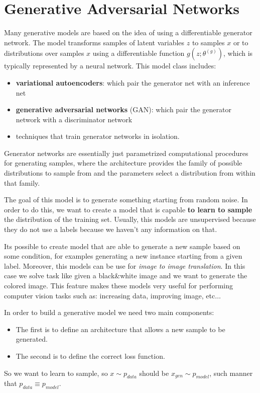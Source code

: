 \chapter{Generative Adversarial Networks}
Many generative models are based on the idea of using a differentiable generator network. The model 
transforms samples of latent variables $z$ to samples $x$ or to distributions over samples $x$ using a 
differentiable function $g(z; \theta^{(g)})$, which is typically represented by a neural network. This 
model class includes:
\begin{itemize}
    \item \textbf{variational autoencoders}: which pair the generator net with an inference 
    net
    \item \textbf{generative adversarial networks} (GAN): which pair the generator network with a discriminator 
    network
    \item techniques that train generator networks in isolation.
\end{itemize} 

Generator networks are essentially just parametrized computational procedures for generating samples, 
where the architecture provides the family of possible distributions to sample from and the parameters 
select a distribution from within that family.

The goal of this model is to generate something starting from random noise. In order to do this, we want 
to create a model that is capable \textbf{to learn to sample} the distribution of the training set. 
Usually, this models are unsupervised because they do not use a labels because we 
haven't any information on that. 

Its possible to create model that are able to generate a new sample based on some condition, for examples 
generating a new instance starting from a given label. Moreover, this models can be use for \textit{image 
    to image translation}. In this case we solve task like given a black\&white image and we want to 
generate the colored image. This feature makes these models very useful for performing computer vision 
tasks such as: increasing data, improving image, etc$\dots$

In order to build a generative model we need two main components:
\begin{itemize}
    \item The first is to define an architecture that allows a new sample to be generated.
    \item The second is to define the correct loss function. 
\end{itemize}
So we want to learn to sample, so $x \sim p_{data}$ should be $x_{gen}\sim p_{model}$, such manner that $p_{data} \equiv p_{model}$.
